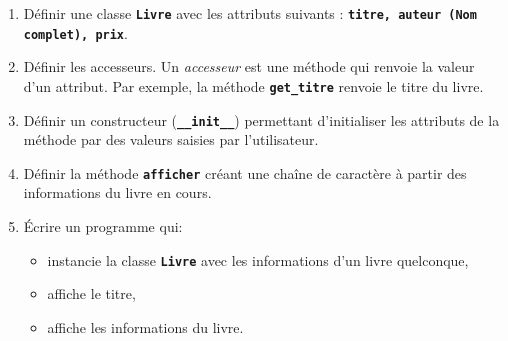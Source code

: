 \documentclass[a4paper,11pt]{article}
\begin{document}
\begin{exo}
    \begin{enumerate}
        \item Définir une classe \textbf{\texttt{Livre}} avec les attributs suivants : \textbf{\texttt{titre, auteur (Nom complet), prix}}.
        \item Définir les accesseurs. Un \emph{accesseur} est une méthode qui renvoie la valeur d'un attribut. Par exemple, la méthode \textbf{\texttt{get\_titre}} renvoie le titre du livre.
        \item Définir un constructeur (\textbf{\texttt{\_\_init\_\_}}) permettant d’initialiser les attributs de la méthode par des valeurs saisies par l’utilisateur.
        \item Définir la méthode \textbf{\texttt{afficher}} créant une chaîne de caractère à partir des informations du livre en cours.
        \item Écrire un programme qui:
              \begin{itemize}
                  \item instancie la classe \textbf{\texttt{Livre}} avec les informations d'un livre quelconque,
                  \item affiche le titre,
                  \item affiche les informations du livre.
              \end{itemize}
    \end{enumerate}
\end{exo}
\end{document}
